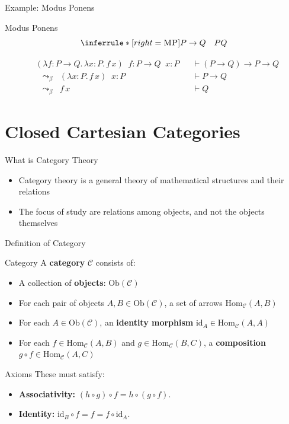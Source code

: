 \documentclass[aspectratio=169]{beamer}
\newcommand{\curly}{\mathrel{\leadsto}_\beta}
\begin{document}
\begin{frame}{Example: Modus Ponens}
  \begin{block}{Modus Ponens}
    \[
      \inferrule*[right=\textsc{MP}]
      {P \to Q \quad P}
      {Q}
    \]
  \end{block}
  \[
    \begin{aligned}
      &(\lambda f : P \to Q.\, \lambda x : P.\, f\, x)\;\; f : P \to Q \;\; x : P 
      &&\vdash (P \to Q) \to P \to Q \\
      &\;\;\curly\;\;
        (\lambda x : P.\, f\, x) \;\; x : P 
      &&\vdash P \to Q \\
      &\;\;\curly\;\;
        f\, x 
      &&\vdash Q 
    \end{aligned}
  \]
\end{frame}


\section{Closed Cartesian Categories}

\begin{frame}{What is Category Theory}
  \begin{itemize}
  \item Category theory is a general theory of mathematical structures and their relations

  \item The focus of study are relations among objects, and not the objects themselves
  \end{itemize}
\end{frame}

\begin{frame}{Definition of Category}
  \begin{block}{Category}
    A \textbf{category} $\mathcal{C}$ consists of:
    \begin{itemize}
    \item A collection of \textbf{objects}: $\mathrm{Ob}(\mathcal{C})$
    \item For each pair of objects $A, B \in \mathrm{Ob}(\mathcal{C})$,
      a set of arrows $\mathrm{Hom}_{\mathcal{C}}(A,B)$
    \item For each $A \in \mathrm{Ob}(\mathcal{C})$, an \textbf{identity morphism}  
      $\mathrm{id}_A \in \mathrm{Hom}_{\mathcal{C}}(A,A)$
    \item For each $f \in \mathrm{Hom}_{\mathcal{C}}(A,B)$ and  
      $g \in \mathrm{Hom}_{\mathcal{C}}(B,C)$, a \textbf{composition}  
      $g \circ f \in \mathrm{Hom}_{\mathcal{C}}(A,C)$
    \end{itemize}
  \end{block}
  \begin{block}{Axioms}
    These must satisfy:
    \begin{itemize}
    \item \textbf{Associativity:} $(h \circ g) \circ f = h \circ (g \circ f)$.
    \item \textbf{Identity:} $\mathrm{id}_B \circ f = f = f \circ \mathrm{id}_A$.
    \end{itemize}
  \end{block}
\end{frame}
\end{document}
